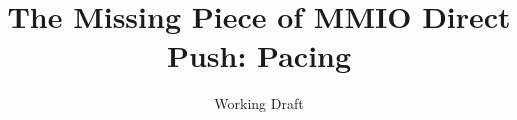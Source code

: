 \documentclass[letterpaper,twocolumn,10pt]{article}
\begin{document}
\date{}

\title{\Large \bf The Missing Piece of MMIO Direct Push: Pacing}

\author{%
{\rm Working Draft}
}

\maketitle












{\small\raggedright}
\end{document}
